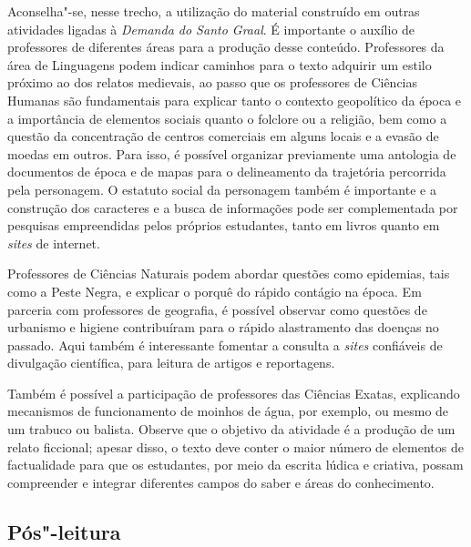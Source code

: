 \documentclass[11pt]{extarticle}
\begin{document}
Aconselha"-se, nesse trecho, a utilização do material construído em
outras atividades ligadas à \emph{Demanda do Santo Graal}. É importante
o auxílio de professores de diferentes áreas para a produção desse
conteúdo. Professores da área de Linguagens podem indicar caminhos para
o texto adquirir um estilo próximo ao dos relatos medievais, ao passo
que os professores de Ciências Humanas são fundamentais para explicar
tanto o contexto geopolítico da época e a importância de elementos
sociais quanto o folclore ou a religião, bem como a questão da
concentração de centros comerciais em alguns locais e a evasão de moedas
em outros. Para isso, é possível organizar previamente uma antologia de
documentos de época e de mapas para o delineamento da trajetória
percorrida pela personagem. O estatuto social da personagem também é
importante e a construção dos caracteres e a busca de informações pode
ser complementada por pesquisas empreendidas pelos próprios estudantes,
tanto em livros quanto em \emph{sites} de internet.

Professores de Ciências Naturais podem abordar questões como epidemias,
tais como a Peste Negra, e explicar o porquê do rápido contágio na
época. Em parceria com professores de geografia, é possível observar
como questões de urbanismo e higiene contribuíram para o rápido
alastramento das doenças no passado. Aqui também é interessante fomentar
a consulta a \emph{sites} confiáveis de divulgação científica, para
leitura de artigos e reportagens.

Também é possível a participação de professores das Ciências Exatas,
explicando mecanismos de funcionamento de moinhos de água, por exemplo,
ou mesmo de um trabuco ou balista. Observe que o objetivo da atividade é
a produção de um relato ficcional; apesar disso, o texto deve conter o
maior número de elementos de factualidade para que os estudantes, por
meio da escrita lúdica e criativa, possam compreender e integrar
diferentes campos do saber e áreas do conhecimento.

\subsection{Pós"-leitura}
\end{document}
